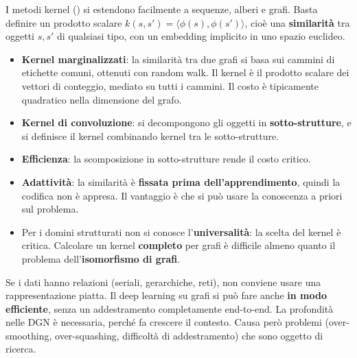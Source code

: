 I metodi kernel () si estendono facilmente a sequenze, alberi e grafi. Basta definire un
prodotto scalare $k(s,s') = \langle\phi(s),\phi(s')\rangle$, cioè una \textbf{similarità} tra oggetti $s,s'$ di
qualsiasi tipo, con un embedding implicito in uno spazio euclideo.
\begin{itemize}
  \item \textbf{Kernel marginalizzati}: la similarità tra due grafi si basa sui cammini di etichette comuni,
        ottenuti con random walk. Il kernel è il prodotto scalare dei vettori di conteggio, mediato su tutti i
        cammini. Il costo è tipicamente quadratico nella dimensione del grafo.
  \item \textbf{Kernel di convoluzione}: si decompongono gli oggetti in \textbf{sotto-strutture}, e si definisce il
        kernel combinando kernel tra le sotto-strutture.
\end{itemize}

\begin{attenzione}
\begin{itemize}
  \item \textbf{Efficienza}: la scomposizione in sotto-strutture rende il costo critico.
  \item \textbf{Adattività}: la similarità è \textbf{fissata prima dell'apprendimento}, quindi la codifica non è
        appresa. Il vantaggio è che si può usare la conoscenza a priori sul problema.
  \item Per i domini strutturati non si conosce l'\textbf{universalità}: la scelta del kernel è critica. Calcolare
        un kernel \textbf{completo} per grafi è difficile almeno quanto il problema dell'\textbf{isomorfismo di
        grafi}.
\end{itemize}
\end{attenzione}

\begin{idea}[Conclusione]
Se i dati hanno relazioni (seriali, gerarchiche, reti), non conviene usare una rappresentazione piatta. Il deep
learning su grafi si può fare anche \textbf{in modo efficiente}, senza un addestramento completamente end-to-end.
La profondità nelle DGN è necessaria, perché fa crescere il contesto. Causa però problemi (over-smoothing,
over-squashing, difficoltà di addestramento) che sono oggetto di ricerca.
\end{idea}

